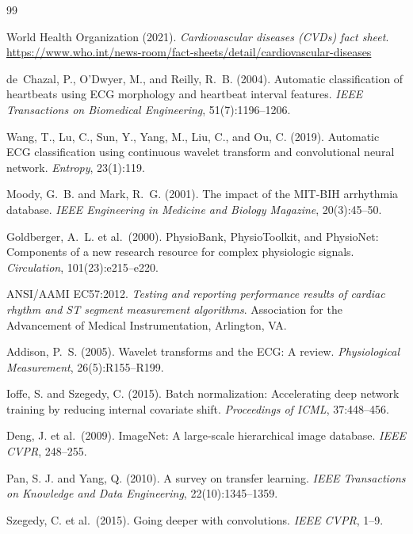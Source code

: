 \documentclass[12pt,a4paper]{article}
\begin{document}
\begin{thebibliography}{99}

World Health Organization (2021).
\textit{Cardiovascular diseases (CVDs) fact sheet}.
\url{https://www.who.int/news-room/fact-sheets/detail/cardiovascular-diseases}

de~Chazal, P., O'Dwyer, M., and Reilly, R.~B. (2004).
Automatic classification of heartbeats using ECG morphology and heartbeat
interval features.
\textit{IEEE Transactions on Biomedical Engineering}, 51(7):1196--1206.

Wang, T., Lu, C., Sun, Y., Yang, M., Liu, C., and Ou, C. (2019).
Automatic ECG classification using continuous wavelet transform and
convolutional neural network.
\textit{Entropy}, 23(1):119.

Moody, G.~B. and Mark, R.~G. (2001).
The impact of the MIT-BIH arrhythmia database.
\textit{IEEE Engineering in Medicine and Biology Magazine}, 20(3):45--50.

Goldberger, A.~L. et al.\ (2000).
PhysioBank, PhysioToolkit, and PhysioNet: Components of a new research resource
for complex physiologic signals.
\textit{Circulation}, 101(23):e215--e220.

ANSI/AAMI EC57:2012.
\textit{Testing and reporting performance results of cardiac rhythm and ST
segment measurement algorithms}.
Association for the Advancement of Medical Instrumentation, Arlington, VA.

Addison, P.~S. (2005).
Wavelet transforms and the ECG: A review.
\textit{Physiological Measurement}, 26(5):R155--R199.

Ioffe, S. and Szegedy, C. (2015).
Batch normalization: Accelerating deep network training by reducing internal
covariate shift.
\textit{Proceedings of ICML}, 37:448--456.

Deng, J. et al.\ (2009).
ImageNet: A large-scale hierarchical image database.
\textit{IEEE CVPR}, 248--255.

Pan, S. J. and Yang, Q. (2010).
A survey on transfer learning.
\textit{IEEE Transactions on Knowledge and Data Engineering},
22(10):1345--1359.

Szegedy, C. et al.\ (2015).
Going deeper with convolutions.
\textit{IEEE CVPR}, 1--9.

\end{thebibliography}
\end{document}
